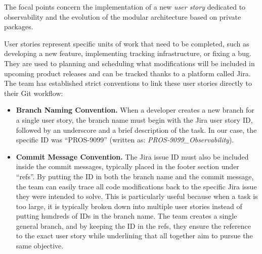 \documentclass[12pt,a4paper,openright,twoside]{book}
\begin{document}
The focal points concern the implementation of a new \textit{user story} dedicated to observability and the evolution of the modular architecture based on private packages. 

User stories represent specific units of work that need to be completed, such as developing a new feature, implementing tracking infrastructure, or fixing a bug. They are used to planning and scheduling what modifications will be included in upcoming product releases and can be tracked thanks to a platform called Jira. The team has established strict conventions to link these user stories directly to their Git workflow: 
\begin{itemize}
    \item \textbf{Branch Naming Convention.} When a developer creates a new branch for a single user story, the branch name must begin with the Jira user story ID, followed by an underscore and a brief description of the task. In our case, the specific ID was ``PROS-9099'' (written as: \textit{PROS-9099\_Observability}). 
    \item \textbf{Commit Message Convention.} The Jira issue ID must also be included inside the commit messages, typically placed in the footer section under ``refs''. By putting the ID in both the branch name and the commit message, the team can easily trace all code modifications back to the specific Jira issue they were intended to solve. This is particularly useful because when a task is too large, it is typically broken down into multiple user stories instead of putting hundreds of IDs in the branch name. The team creates a single general branch, and by keeping the ID in the refs, they ensure the reference to the exact user story while underlining that all together aim to pursue the same objective. 
\end{itemize}
\end{document}
